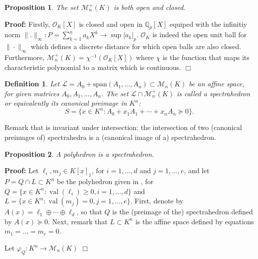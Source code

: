 \documentclass[a4paper,12pt]{article}
\newenvironment{proof}{\hbox{}\vspace{-0.8cm} {\bf Proof:}}{\hfill $\Box$}
\newtheorem{proposition}{Proposition}
\newtheorem{definition}{Definition}
\newtheorem{remark}{Remark}
\renewcommand{\span}[1]{{\text{span}(#1)}} %
\DeclareMathOperator{\val}{val}
\newcommand{\OK}{\mathcal{O}_K}
\begin{document}
\begin{proposition}
	The set $\mathcal{M}_n^+(K)$ is both open and closed.
\end{proposition}
\begin{proof}
Firstly, $\OK[X]$ is closed and open in $\mathbb{Q}_{p}[X]$ equiped with the infinitiy norm $\|.\|_\infty : P = \sum_{k=1}^{n} a_k X^k \to \sup |a_k|_p$. $\OK$ is indeed the open unit ball for $\|\cdot \|_\infty$ which defines a discrete distance for which open balls are also closed.
Furthermore, $\mathcal{M}^+_{n}(K) = \chi^{-1}(\OK[X]) $ where $\chi$ is the function that maps its characteristic polynomial to a matrix which is continuous.
\end{proof}

\begin{definition}
  \label{def_spectrahedra}
  Let $\mathcal{L} = A_0+\span{A_1,\ldots,A_n} \subset \mathcal{M}_n(K)$ be an affine space, for given
  matrices $A_0,A_1,\ldots,A_n$.
  The set $\mathcal{L} \cap \mathcal{M}_n^+(K)$ is called a \emph{spectrahedron} or equivalently
  its canonical preimage in $K^n$:
  $$
  S = \{x \in K^n : A_0+x_1A_1+\cdots+x_nA_n \succeq 0\}.
  $$
\end{definition}

Remark that  is invariant under intersection: the intersection of two
(canonical preimages of) spectrahedra is a (canonical image of a) spectrahedron.

\begin{proposition}
  A polyhedron is a spectrahedron.
\end{proposition}
\begin{proof}
  Let $\ell_i,m_j \in K[x]_1$, for $i=1,\ldots,d$ and $j=1,\ldots,e$, and let $P = Q \cap L \subset K^n$
  be the polyhedron given in , for $Q = \{x \in K^n : \val(\ell_i) \geq 0, i=1,\ldots,d\}$
  and $L = \{x \in K^n : \val(m_j) = 0, j=1,\ldots,e\}$.
  First, denote by $A(x) = \ell_1 \oplus \cdots \oplus \ell_d$, so that $Q$ is the (preimage of the)
  spectrahedron defined by $A(x) \succeq 0$.
  Next, remark that $L \subset K^n$ is the affine space defined by equations $m_1=\ldots=m_e=0$.

  Let $\varphi_Q : K^n \to \mathcal{M}_n(K)$
\end{proof}
\end{document}
